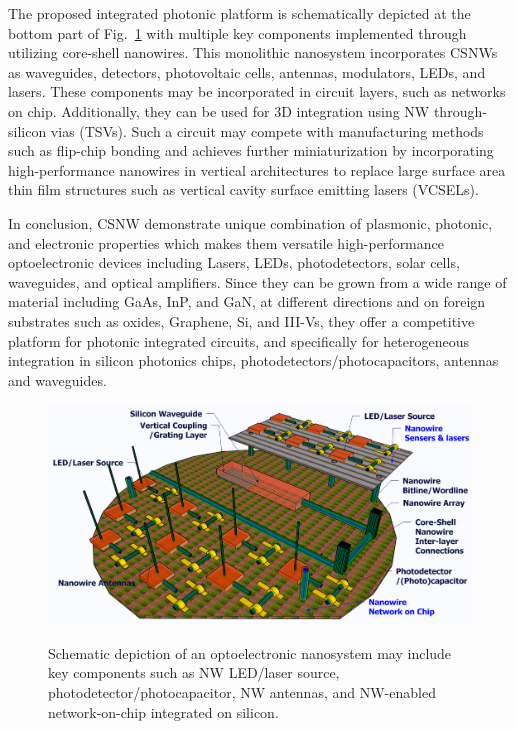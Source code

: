 The proposed integrated photonic platform is schematically depicted at the
bottom part of Fig.~\ref{NWPIC_NB} with multiple key components implemented
through utilizing core-shell nanowires. This monolithic nanosystem incorporates
CSNWs as waveguides, detectors, photovoltaic cells, antennas, modulators, LEDs,
and lasers. These components may be incorporated in circuit layers, such as
networks on chip. Additionally, they can be used for 3D integration using NW
through-silicon vias (TSVs). Such a circuit may compete with manufacturing
methods such as flip-chip bonding and achieves further miniaturization by
incorporating high-performance nanowires in vertical architectures to replace
large surface area thin film structures such as vertical cavity surface
emitting lasers (VCSELs).

In conclusion, CSNW demonstrate unique combination of plasmonic, photonic, and
electronic properties which makes them versatile high-performance
optoelectronic devices including Lasers, LEDs, photodetectors, solar cells,
waveguides, and optical amplifiers. Since they can be grown from a wide range
of material including GaAs, InP, and GaN, at different directions and on
foreign substrates such as oxides, Graphene, Si, and III-Vs, they offer a
competitive platform for photonic integrated circuits, and specifically for
heterogeneous integration in silicon photonics chips,
photodetectors/photocapacitors, antennas and waveguides.

\begin{figure}
  \caption{Schematic depiction of an optoelectronic nanosystem may include key components such as NW LED/laser source, photodetector/photocapacitor, NW antennas, and NW-enabled network-on-chip integrated on silicon.}
  \centering
  \includegraphics[width=\textwidth]{pictures/Conclusion/NWPIC_NB}
  \label{NWPIC_NB}
\end{figure}
